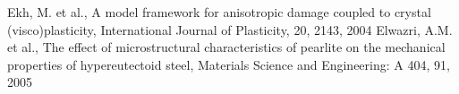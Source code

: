 \documentclass[11pt,a4paper]{article}
\begin{document}
\begin{thebibliography}{99}


Ekh, M.  et al.,
A model framework for anisotropic damage coupled to crystal (visco)plasticity,
International Journal of Plasticity,
20,
2143,
2004
%
Elwazri, A.M. et al.,
The effect of microstructural characteristics of pearlite on the mechanical properties of
hypereutectoid steel,
Materials Science and Engineering: A
404,
91,
2005



\end{thebibliography}
\end{document}
